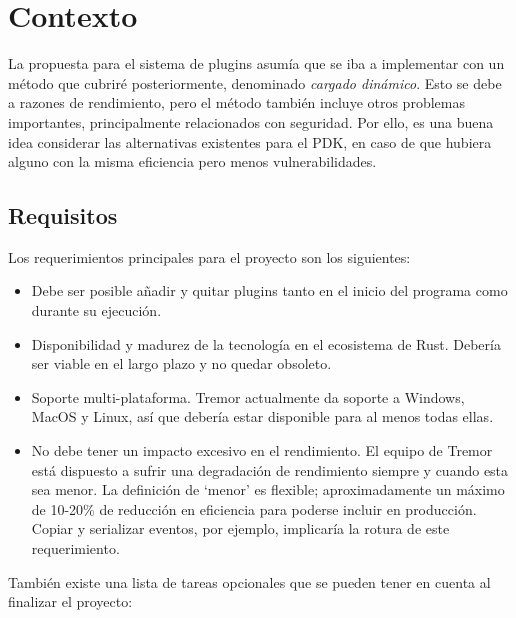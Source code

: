 
\chapter{Contexto}\label{sec:investigation}

La propuesta para el sistema de plugins asumía que se iba a implementar con un
método que cubriré posteriormente, denominado \emph{cargado dinámico}. Esto se
debe a razones de rendimiento, pero el método también incluye otros problemas
importantes, principalmente relacionados con seguridad. Por ello, es una buena
idea considerar las alternativas existentes para el PDK, en caso de que hubiera
alguno con la misma eficiencia pero menos vulnerabilidades.

\section{Requisitos}

Los requerimientos principales para el proyecto son los siguientes:

\begin{itemize}
    \item Debe ser posible añadir y quitar plugins tanto en el inicio del
        programa como durante su ejecución.

    \item Disponibilidad y madurez de la tecnología en el ecosistema de Rust.
        Debería ser viable en el largo plazo y no quedar obsoleto.

    \item Soporte multi-plataforma. Tremor actualmente da soporte a Windows,
        MacOS y Linux, así que debería estar disponible para al menos todas
        ellas.

    \item No debe tener un impacto excesivo en el rendimiento. El equipo de
        Tremor está dispuesto a sufrir una degradación de rendimiento siempre y
        cuando esta sea menor. La definición de `menor' es flexible;
        aproximadamente un máximo de 10-20\% de reducción en eficiencia para
        poderse incluir en producción. Copiar y serializar eventos, por ejemplo,
        implicaría la rotura de este requerimiento.

\end{itemize}

También existe una lista de tareas opcionales que se pueden tener en cuenta al
finalizar el proyecto:

